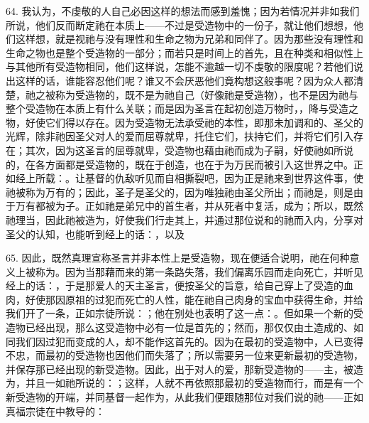 64. 我认为，不虔敬的人自己必因这样的想法而感到羞愧；因为若情况并非如我们所说，他们反而断定祂在本质上——不过是受造物中的一份子，就让他们想想，他们这样想，就是视祂与没有理性和生命之物为兄弟和同伴了。因为那些没有理性和生命之物也是整个受造物的一部分；而若只是时间上的首先，且在种类和相似性上与其他所有受造物相同，他们这样说，怎能不逾越一切不虔敬的限度呢？若他们说出这样的话，谁能容忍他们呢？谁又不会厌恶他们竟构想这般事呢？因为众人都清楚，祂之被称为受造物的，既不是为祂自己（好像祂是受造物），也不是因为祂与整个受造物在本质上有什么关联；而是因为圣言在起初创造万物时，，降与受造之物，好使它们得以存在。因为受造物无法承受祂的本性，即那未加调和的、圣父的光辉，除非祂因圣父对人的爱而屈尊就卑，托住它们，扶持它们，并将它们引入存在；其次，因为这圣言的屈尊就卑，受造物也藉由祂而成为子嗣，好使祂如所说的，在各方面都是受造物的，既在于创造，也在于为万民而被引入这世界之中。正如经上所载：。让基督的仇敌听见而自相撕裂吧，因为正是祂来到世界这件事，使祂被称为万有的；因此，圣子是圣父的，因为唯独祂由圣父所出；而祂是，则是由于万有都被为子。正如祂是弟兄中的首生者，并从死者中复活，成为；所以，既然祂理当，因此祂被造为，好使我们行走其上，并通过那位说和的祂而入内，分享对圣父的认知，也能听到经上的话：，以及\par

65. 因此，既然真理宣称圣言并非本性上是受造物，现在便适合说明，祂在何种意义上被称为。因为当那藉而来的第一条路失落，我们偏离乐园而走向死亡，并听见经上的话：，于是那爱人的天主圣言，便按圣父的旨意，给自己穿上了受造的血肉，好使那因原祖的过犯而死亡的人性，能在祂自己肉身的宝血中获得生命，并给我们开了一条，正如宗徒所说：；他在别处也表明了这一点：。但如果一个新的受造物已经出现，那么这受造物中必有一位是首先的；然而，那仅仅由土造成的、如同我们因过犯而变成的人，却不能作这首先的。因为在最初的受造物中，人已变得不忠，而最初的受造物也因他们而失落了；所以需要另一位来更新最初的受造物，并保存那已经出现的新受造物。因此，出于对人的爱，那新受造物的——主，被造为，并且一如祂所说的：；这样，人就不再依照那最初的受造物而行，而是有一个新受造物的开端，并同基督一起作为，从此我们便跟随那位对我们说的祂——正如真福宗徒在中教导的：\par

